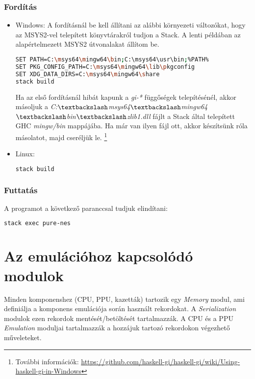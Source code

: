 \subsubsection{Fordítás}
\begin{itemize}
	\item Windows: A fordításnál be kell állítani az alábbi környezeti változókat, hogy 
	az MSYS2-vel telepített könyvtárakról tudjon a Stack. A lenti példában az alapértelmezett MSYS2 útvonalakat állítom be.
\begin{lstlisting}[language=bash]
SET PATH=C:\msys64\mingw64\bin;C:\msys64\usr\bin;%PATH%
SET PKG_CONFIG_PATH=C:\msys64\mingw64\lib\pkgconfig
SET XDG_DATA_DIRS=C:\msys64\mingw64\share
stack build
\end{lstlisting}
	Ha az első fordításnál hibát kapunk a \emph{gi-*} függőségek telepítésénél, akkor másoljuk a 
	\emph{C:$\textbackslash$msys64$\textbackslash$mingw64$\textbackslash$bin$\textbackslash$zlib1.dll} fájlt a Stack által telepített GHC \emph{mingw/bin} mappájába. Ha már van ilyen fájl ott, akkor készítsünk róla másolatot, majd cseréljük le.
	\footnote{További információk: \url{https://github.com/haskell-gi/haskell-gi/wiki/Using-haskell-gi-in-Windows}}

	\item Linux:
\begin{lstlisting}[language=bash]
stack build
\end{lstlisting}
\end{itemize}

\subsubsection{Futtatás}
A programot a következő paranccsal tudjuk elindítani:
\begin{lstlisting}[language=bash]
stack exec pure-nes
\end{lstlisting}

\section{Az emulációhoz kapcsolódó modulok}

Minden komponenshez (CPU, PPU, kazetták) tartozik egy \emph{Memory} modul, ami definiálja a komponens emulációja során használt rekordokat. A \emph{Serialization} modulok ezen rekordok mentését/betöltését tartalmazzák. A CPU és a PPU \emph{Emulation} moduljai tartalmazzák a hozzájuk tartozó rekordokon végezhető műveleteket.

